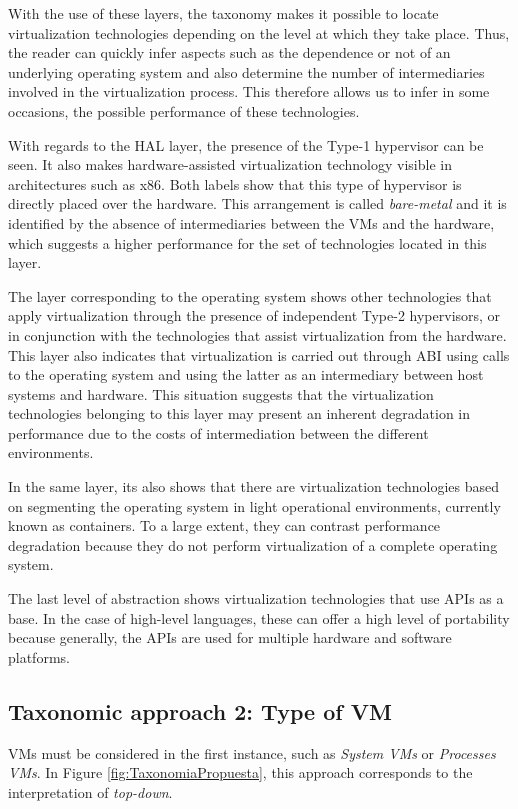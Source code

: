	With the use of these layers, the taxonomy makes it possible to locate virtualization technologies depending on the level at which they take place. Thus, the reader can quickly infer aspects such as the dependence or not of an underlying operating system and also determine the number of intermediaries involved in the virtualization process. This therefore allows us to infer in some occasions, the possible performance of these technologies.
	
	With regards to the HAL layer, the presence of the Type-1 hypervisor can be seen. It also makes hardware-assisted virtualization technology visible in architectures such as x86. Both labels show that this type of hypervisor is directly placed over the hardware.  This arrangement is called \textit{bare-metal} and it is identified by the absence of intermediaries between the VMs and the hardware, which suggests a higher performance for the set of technologies located in this layer.
	
	The layer corresponding to the operating system shows other technologies that apply virtualization through the presence of independent Type-2 hypervisors, or in conjunction with the technologies that assist virtualization from the hardware. This layer also indicates that virtualization is carried out through ABI using calls to the operating system and using the latter as an intermediary between host systems and hardware. This situation suggests that the virtualization technologies belonging to this layer may present an inherent degradation in performance due to the costs of intermediation between the different environments.
	
	In the same layer, its also shows that there are virtualization technologies based on segmenting the operating system in light operational environments, currently known as containers. To a large extent, they can contrast performance degradation because they do not perform virtualization of a complete operating system.
	
	The last level of abstraction shows virtualization technologies that use APIs as a base. In the case of high-level languages, these can offer a high level of portability because generally, the APIs are used for multiple hardware and software platforms.
	
	\subsection{Taxonomic approach 2: Type of VM}
	
	VMs must be considered in the first instance, such as \textit{System VMs} or \textit{ Processes VMs}. In Figure \ref{fig:TaxonomiaPropuesta}, this approach corresponds to the interpretation of \textit{top-down}.
	
